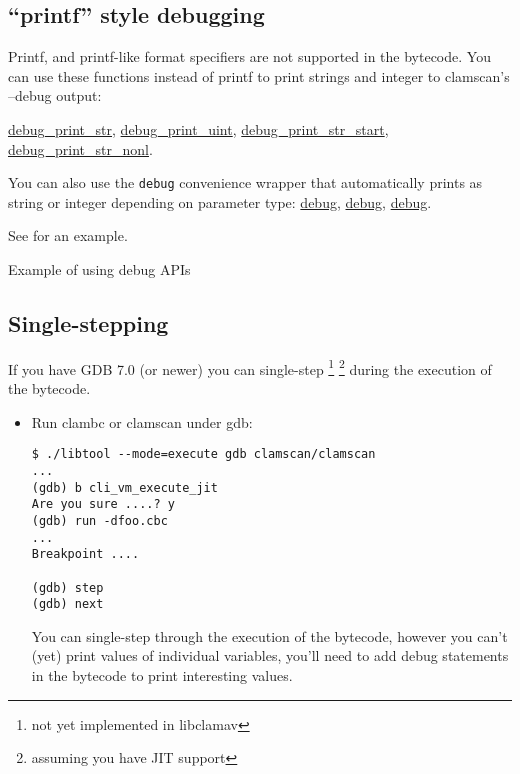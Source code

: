 \subsection{``printf'' style debugging}
Printf, and printf-like format specifiers are not supported in the bytecode.
You can use these functions instead of printf to print strings and integer to
clamscan's --debug output:

\hyperlink{bytecode__api_8h_aa6d82179ea15d32450fefbc6d1bd8934}{debug\_\-print\_\-str},
\hyperlink{bytecode__api_8h_a6e0cdd4d4c76ed46a8627bee56eee1c1}{debug\_\-print\_\-uint},
\hyperlink{bytecode__api_8h_a43707290a22915315c960422a88ba4d4}{debug\_\-print\_\-str\_\-start},
\hyperlink{bytecode__api_8h_a02f173e084fc9a4b9eaf3017aa4243ba}{debug\_\-print\_\-str\_\-nonl}.

You can also use the \verb+debug+ convenience wrapper that automatically prints
as string or integer depending on parameter type:
\hyperlink{bytecode__local_8h_aa6f11e14ec5677b64c7f623a08a81ceb}{debug},
\hyperlink{bytecode__local_8h_a7393b44e1359ec29419ccee63a730716}{debug},
\hyperlink{bytecode__local_8h_a86350ab4540ed8cc1607409355a1b04c}{debug}.

See  for an example.
\begin{program}

\caption{Example of using debug APIs}
\label{prg:debugapi}
\end{program}

\subsection{Single-stepping}
If you have GDB 7.0 (or newer) you can single-step \footnote{not yet implemented in libclamav} \footnote{assuming you have JIT support}
during the execution of the bytecode.
\begin{itemize}
 \item Run clambc or clamscan under gdb:
\begin{verbatim}
$ ./libtool --mode=execute gdb clamscan/clamscan
...
(gdb) b cli_vm_execute_jit
Are you sure ....? y
(gdb) run -dfoo.cbc
...
Breakpoint ....

(gdb) step
(gdb) next
\end{verbatim}

You can single-step through the execution of the bytecode, however you can't (yet) print values of individual variables,
you'll need to add debug statements in the bytecode to print interesting values.

\end{itemize}


